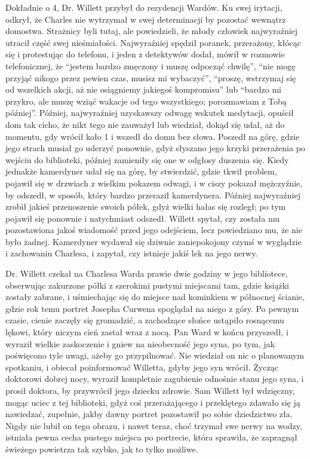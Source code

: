 Dokładnie o 4, Dr. Willett przybył do rezydencji Wardów. Ku swej irytacji, odkrył, że Charles nie wytrzymał w swej determinacji by pozostać wewnątrz domostwa. Strażnicy byli tutaj, ale powiedzieli, że młody człowiek najwyraźniej utracił część swej nieśmiałości. Najwyraźniej spędził poranek, przerażony, kłócąc się i protestując do telefonu, i jeden z detektywów dodał, mówił w rozmowie telefonicznej, że ``jestem bardzo zmęczony i muszę odpocząć chwilę'', ``nie mogę przyjąć nikogo przez pewien czas, musisz mi wybaczyć'', ``proszę, wstrzymaj się od wszelkich akcji, aż nie osiągniemy jakiegoś kompromisu'' lub ``bardzo mi przykro, ale muszę wziąć wakacje od tego wszystkiego; porozmawiam z Tobą później''. Później, najwyraźniej uzyskawszy odwagę wskutek medytacji, opuścił dom tak cicho, że nikt tego nie zauważył lub wiedział, dokąd się udał, aż do momentu, gdy wrócił koło 1 i wszedł do domu bez słowa. Poszedł na górę, gdzie jego strach musiał go uderzyć ponownie, gdyż słyszano jego krzyki przerażenia po wejściu do biblioteki, później zamieniły się one w odgłosy duszenia się. Kiedy jednakże kamerdyner udał się na górę, by stwierdzić, gdzie tkwił problem, pojawił się w drzwiach z wielkim pokazem odwagi, i w ciszy pokazał mężczyźnie, by odszedł, w sposób, który bardzo przeraził kamerdynera. Później najwyraźniej zrobił jakieś przenoszenie swoich półek, gdyż wielki hałas się rozległ; po tym pojawił się ponownie i natychmiast odszedł. Willett spytał, czy została mu pozostawiona jakoś wiadomość przed jego odejściem, lecz powiedziano mu, że nie było żadnej. Kamerdyner wydawał się dziwnie zaniepokojony czymś w wyglądzie i zachowaniu Charlesa, i zapytał, czy istnieje jakiś lek na jego nerwy.

Dr. Willett czekał na Charlesa Warda prawie dwie godziny w jego bibliotece, obserwując zakurzone półki z szerokimi pustymi miejscami tam, gdzie książki zostały zabrane, i uśmiechając się do miejsce nad kominkiem w północnej ścianie, gdzie rok temu portret Josepha Curwena spoglądał na niego z góry. Po pewnym czasie, cienie zaczęły się gromadzić, a zachodzące słońce ustąpiło rosnącemu lękowi, który niczym cień zastał wraz z nocą. Pan Ward w końcu przyszedł, i wyraził wielkie zaskoczenie i gniew na nieobecność jego syna, po tym, jak poświęcono tyle uwagi, ażeby go przypilnować. Nie wiedział on nic o planowanym spotkaniu, i obiecał poinformować Willetta, gdyby jego syn wrócił. Życząc doktorowi dobrej nocy, wyraził kompletnie zagubienie odnośnie stanu jego syna, i prosił doktora, by przywrócił jego dziecku zdrowie. Sam Willett był wdzięczny, mogąc uciec z tej biblioteki, gdyż coś przerażającego i przeklętego zdawało się ją nawiedzać, zupełnie, jakby dawny portret pozostawił po sobie dziedzictwo zła. Nigdy nie lubił on tego obrazu, i nawet teraz, choć trzymał swe nerwy na wodzy, istniała pewna cecha pustego miejsca po portrecie, która sprawiła, że zapragnął świeżego powietrza tak szybko, jak to tylko możliwe. 

